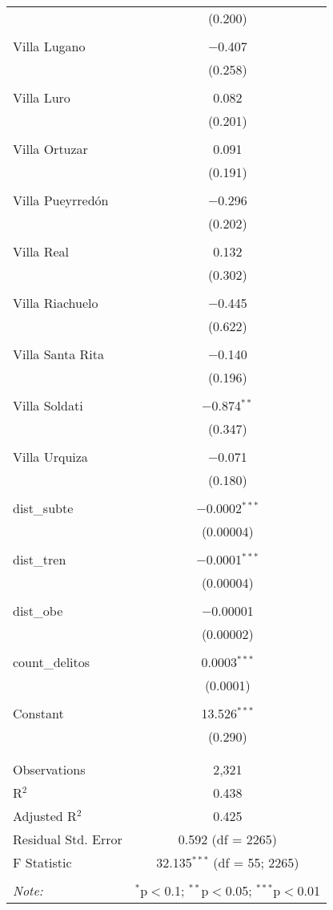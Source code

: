 \begin{table}[!htbp]
\begin{tabular}{@{\extracolsep{5pt}}lc}
  & (0.200) \\ 
  & \\ 
 Villa Lugano & $-$0.407 \\ 
  & (0.258) \\ 
  & \\ 
 Villa Luro & 0.082 \\ 
  & (0.201) \\ 
  & \\ 
 Villa Ortuzar & 0.091 \\ 
  & (0.191) \\ 
  & \\ 
 Villa Pueyrredón & $-$0.296 \\ 
  & (0.202) \\ 
  & \\ 
 Villa Real & 0.132 \\ 
  & (0.302) \\ 
  & \\ 
 Villa Riachuelo & $-$0.445 \\ 
  & (0.622) \\ 
  & \\ 
 Villa Santa Rita & $-$0.140 \\ 
  & (0.196) \\ 
  & \\ 
 Villa Soldati & $-$0.874$^{**}$ \\ 
  & (0.347) \\ 
  & \\ 
 Villa Urquiza & $-$0.071 \\ 
  & (0.180) \\ 
  & \\ 
 dist\_subte & $-$0.0002$^{***}$ \\ 
  & (0.00004) \\ 
  & \\ 
 dist\_tren & $-$0.0001$^{***}$ \\ 
  & (0.00004) \\ 
  & \\ 
 dist\_obe & $-$0.00001 \\ 
  & (0.00002) \\ 
  & \\ 
 count\_delitos & 0.0003$^{***}$ \\ 
  & (0.0001) \\ 
  & \\ 
 Constant & 13.526$^{***}$ \\ 
  & (0.290) \\ 
  & \\ 
\hline \\[-1.8ex] 
Observations & 2,321 \\ 
R$^{2}$ & 0.438 \\ 
Adjusted R$^{2}$ & 0.425 \\ 
Residual Std. Error & 0.592 (df = 2265) \\ 
F Statistic & 32.135$^{***}$ (df = 55; 2265) \\ 
\hline 
\hline \\[-1.8ex] 
\textit{Note:}  & \multicolumn{1}{r}{$^{*}$p$<$0.1; $^{**}$p$<$0.05; $^{***}$p$<$0.01} \\ 
\end{tabular} 
\end{table} 

